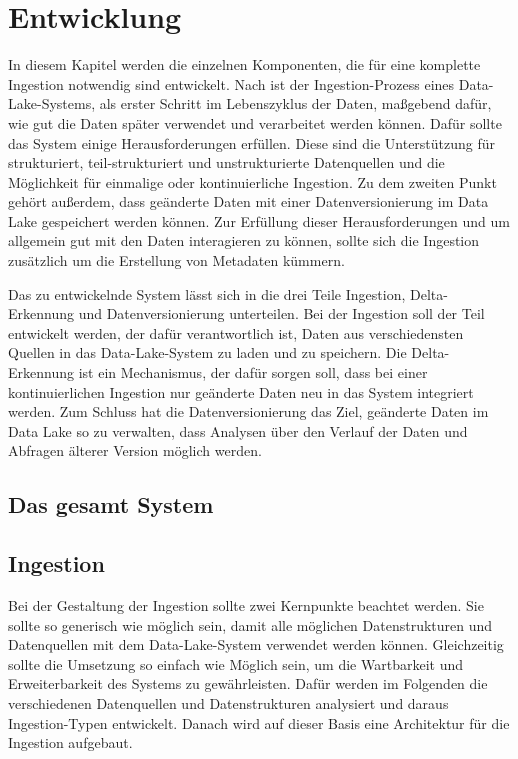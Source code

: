 \section{Entwicklung}
In diesem Kapitel werden die einzelnen Komponenten, die für eine komplette Ingestion notwendig sind entwickelt.
Nach \citeauthor{DL-Ing-Mgmt} ist der Ingestion-Prozess eines Data-Lake-Systems, als erster Schritt im Lebenszyklus der Daten, maßgebend dafür, wie gut die Daten später verwendet und verarbeitet werden können.
Dafür sollte das System einige Herausforderungen erfüllen.
Diese sind die Unterstützung für strukturiert, teil-strukturiert und unstrukturierte Datenquellen und die Möglichkeit für einmalige oder kontinuierliche Ingestion.
Zu dem zweiten Punkt gehört außerdem, dass geänderte Daten mit einer Datenversionierung im Data Lake gespeichert werden können.
Zur Erfüllung dieser Herausforderungen und um allgemein gut mit den Daten interagieren zu können, sollte sich die Ingestion zusätzlich um die Erstellung von Metadaten kümmern.

Das zu entwickelnde System lässt sich in die drei Teile Ingestion, Delta-Erkennung und Datenversionierung unterteilen.
Bei der Ingestion soll der Teil entwickelt werden, der dafür verantwortlich ist, Daten aus verschiedensten Quellen in das Data-Lake-System zu laden und zu speichern.
Die Delta-Erkennung ist ein Mechanismus, der dafür sorgen soll, dass bei einer kontinuierlichen Ingestion nur geänderte Daten neu in das System integriert werden.
Zum Schluss hat die Datenversionierung das Ziel, geänderte Daten im Data Lake so zu verwalten, dass Analysen über den Verlauf der Daten und Abfragen älterer Version möglich werden.

\subsection{Das gesamt System}

\subsection{Ingestion}
Bei der Gestaltung der Ingestion sollte zwei Kernpunkte beachtet werden.
Sie sollte so generisch wie möglich sein, damit alle möglichen Datenstrukturen und Datenquellen mit dem Data-Lake-System verwendet werden können.
Gleichzeitig sollte die Umsetzung so einfach wie Möglich sein, um die Wartbarkeit und Erweiterbarkeit des Systems zu gewährleisten.
Dafür werden im Folgenden die verschiedenen Datenquellen und Datenstrukturen analysiert und daraus Ingestion-Typen entwickelt.
Danach wird auf dieser Basis eine Architektur für die Ingestion aufgebaut.

